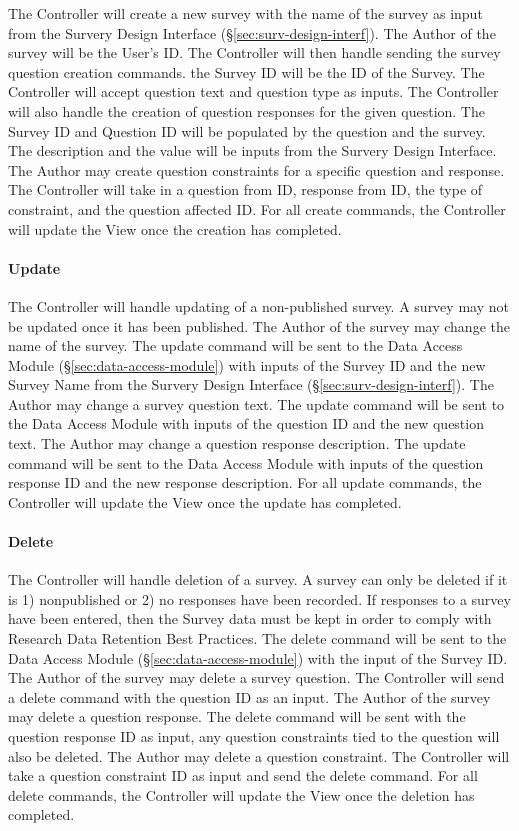\documentclass{article}
\begin{document}
The Controller will create a new survey with the name of the survey as
input from the Survery Design Interface (\S\ref{sec:surv-design-interf}).  The Author of the
survey will be the User's ID.  The Controller will then handle sending
the survey question creation commands.  the Survey ID will be the ID of the
Survey.  The Controller will accept question text and question type as
inputs.  The Controller will also handle the creation of question
responses for the given question.  The Survey ID and Question ID will
be populated by the question and the survey.  The description and the
value will be inputs from the Survery Design Interface.  The
Author may create question constraints for a specific question and
response.  The Controller will take in a question from ID, response
from ID, the type of constraint, and the question affected ID.  For all
create commands, the Controller will update the View once the creation
has completed.

\paragraph{Update}
\label{sec:survey-designer-update}

The Controller will handle updating of a non-published survey.  A
survey may not be updated once it has been published.  The Author of
the survey may change the name of the survey.  The update command will
be sent to the Data Access Module (\S\ref{sec:data-access-module}) with inputs of the
Survey ID and the new Survey Name from the
Survery Design Interface (\S\ref{sec:surv-design-interf}).  The Author may change a survey
question text.  The update command will be sent to the
Data Access Module with inputs of the question ID and the
new question text.  The Author may change a question response
description.  The update command will be sent to the
Data Access Module with inputs of the question response ID
and the new response description.  For all update commands, the
Controller will update the View once the update has completed.

\paragraph{Delete}
\label{sec:survey-designer-delete}

The Controller will handle deletion of a survey.  A survey can only be
deleted if it is 1) nonpublished or 2) no responses have been recorded.
If responses to a survey have been entered, then the Survey data must be
kept in order to comply with Research Data Retention Best Practices.  The
delete command will be sent to the Data Access Module (\S\ref{sec:data-access-module}) with the
input of the Survey ID.  The Author of the survey may delete a survey
question.  The Controller will send a delete command with the question
ID as an input.  The Author of the survey may delete a question
response.  The delete command will be sent with the question response
ID as input, any question constraints tied to the question will also
be deleted.  The Author may delete a question constraint.  The
Controller will take a question constraint ID as input and send the
delete command.  For all delete commands, the Controller will update
the View once the deletion has completed.
\end{document}

